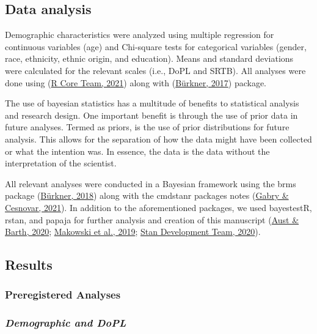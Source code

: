 \documentclass[
  donotrepeattitle,doc, 12pt, a4paper,floatsintext]{apa7}
\begin{document}
\hypertarget{data-analysis-5}{%
\subsection{Data analysis}\label{data-analysis-5}}

Demographic characteristics were analyzed using multiple regression for continuous variables (age) and Chi-square tests for categorical variables (gender, race, ethnicity, ethnic origin, and education). Means and standard deviations were calculated for the relevant scales (i.e., DoPL and SRTB). All analyses were done using (\protect\hyperlink{ref-rcoreteam2021}{R Core Team, 2021}) along with (\protect\hyperlink{ref-burkner2017}{Bürkner, 2017}) package.

The use of bayesian statistics has a multitude of benefits to statistical analysis and research design. One important benefit is through the use of prior data in future analyses. Termed as priors, is the use of prior distributions for future analysis. This allows for the separation of how the data might have been collected or what the intention was. In essence, the data is the data without the interpretation of the scientist.

All relevant analyses were conducted in a Bayesian framework using the brms package (\protect\hyperlink{ref-burkner2018}{Bürkner, 2018}) along with the cmdstanr packages notes (\protect\hyperlink{ref-gabry2021}{Gabry \& Cesnovar, 2021}). In addition to the aforementioned packages, we used bayestestR, rstan, and papaja for further analysis and creation of this manuscript (\protect\hyperlink{ref-aust2020}{Aust \& Barth, 2020}; \protect\hyperlink{ref-makowski2019}{Makowski et al., 2019}; \protect\hyperlink{ref-standevelopmentteam2020}{Stan Development Team, 2020}).

\hypertarget{results-2}{%
\subsection{Results}\label{results-2}}

\hypertarget{preregistered-analyses-3}{%
\subsubsection{Preregistered Analyses}\label{preregistered-analyses-3}}

\hypertarget{demographic-and-dopl-2}{%
\subsubsection{\texorpdfstring{\emph{Demographic and DoPL}}{Demographic and DoPL}}\label{demographic-and-dopl-2}}
\end{document}
